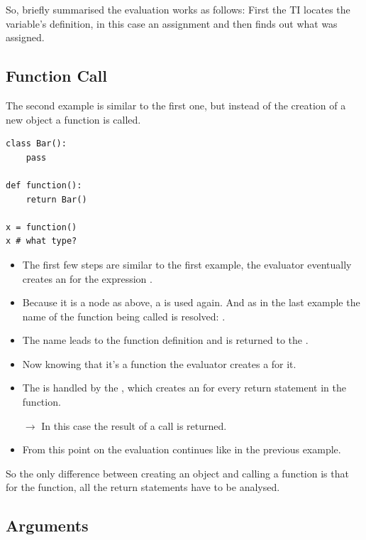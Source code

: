 \documentclass[12pt,halfparskip,DIV11,BCOR10mm]{scrreprt}
\begin{document}
So, briefly summarised the evaluation works as follows: First the TI locates the variable's definition, in this case an assignment and then finds out what was assigned.

\subsection{Function Call}

The second example is similar to the first one, but instead of the creation of a new object a function is called.

\begin{lstlisting}
class Bar():
    pass

def function():
    return Bar()

x = function()
x # what type?
\end{lstlisting}

\begin{itemize}
    \item The first few steps are similar to the first example, the evaluator eventually creates an  for the expression .
    \item Because it is a  node as above, a  is used again. And as in the last example the name of the function being called is resolved: .
    \item The name  leads to the function definition and is returned to the .
    \item Now knowing that it's a function the evaluator creates a  for it.
    \item The  is handled by the , which creates an  for every return statement in the function.
    \item[$\rightarrow$] In this case the result of a  call is returned.
    \item From this point on the evaluation continues like in the previous example.
\end{itemize}

So the only difference between creating an object and calling a function is that for the function, all the return statements have to be analysed.

\subsection{Arguments}
\end{document}
